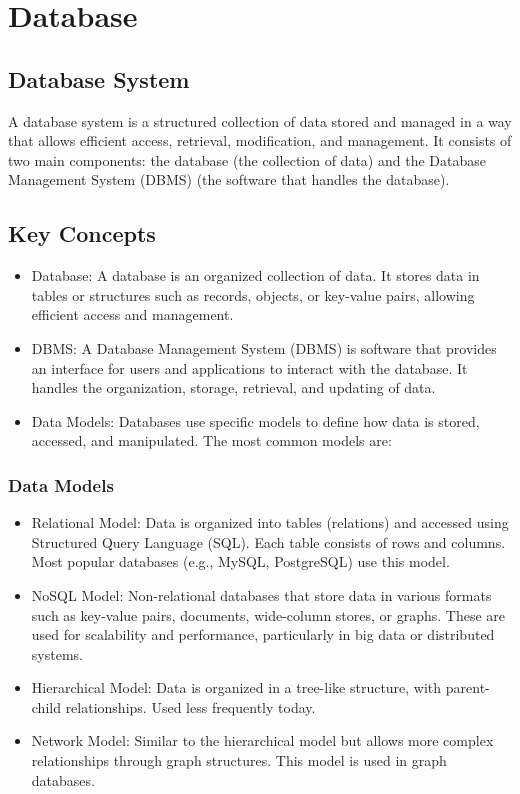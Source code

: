 \documentclass[openany]{book} %
\begin{document}
\chapter{Database}
\section{Database System}
A database system is a structured collection of data stored and managed in a way that allows efficient access, retrieval, modification, and management. It consists of two main components: the database (the collection of data) and the Database Management System (DBMS) (the software that handles the database).
\section{Key Concepts}

\begin{itemize}
\item Database: A database is an organized collection of data. It stores data in tables or structures such as records, objects, or key-value pairs, allowing efficient access and management.
\item DBMS: A Database Management System (DBMS) is software that provides an interface for users and applications to interact with the database. It handles the organization, storage, retrieval, and updating of data.
\item Data Models: Databases use specific models to define how data is stored, accessed, and manipulated. The most common models are:
\end{itemize}
\subsection{Data Models}

\begin{itemize}
\item Relational Model: Data is organized into tables (relations) and accessed using Structured Query Language (SQL). Each table consists of rows and columns. Most popular databases (e.g., MySQL, PostgreSQL) use this model.
\item NoSQL Model: Non-relational databases that store data in various formats such as key-value pairs, documents, wide-column stores, or graphs. These are used for scalability and performance, particularly in big data or distributed systems.
\item Hierarchical Model: Data is organized in a tree-like structure, with parent-child relationships. Used less frequently today.
\item Network Model: Similar to the hierarchical model but allows more complex relationships through graph structures. This model is used in graph databases.
\end{itemize}
\end{document}
